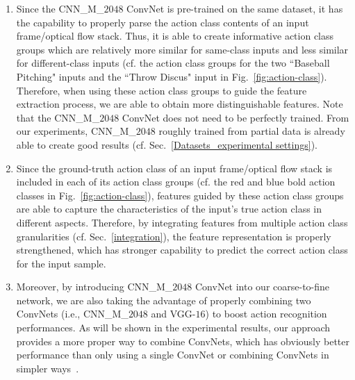 \documentclass[letterpaper]{article} %
\begin{document}
\begin{enumerate}
 \item Since the CNN\_M\_$2048$ ConvNet is pre-trained on the same dataset, it has the capability to properly parse the action class contents of an input frame/optical flow stack. Thus, it is able to create informative action class groups which are relatively more similar for same-class inputs and less similar for different-class inputs (cf. the action class groups for the two ``Baseball Pitching" inputs and the ``Throw Discus" input in Fig.~\ref{fig:action-class}). Therefore, when using these action class groups to guide the feature extraction process, we are able to obtain more distinguishable features. Note that the CNN\_M\_$2048$ ConvNet does not need to be perfectly trained. From our experiments, CNN\_M\_$2048$  roughly trained from partial data is already able to create good results (cf. Sec.~\ref{Datasets_experimental settings}).
 \item Since the ground-truth action class of an input frame/optical flow stack is included in each of its action class groups (cf. the red and blue bold action classes in Fig.~\ref{fig:action-class}), features guided by these action class groups are able to capture the characteristics of the input's true action class in different aspects. Therefore, by integrating features from multiple action class granularities (cf. Sec.~\ref{integration}), the feature representation is properly strengthened, which has stronger capability to predict the correct action class for the input sample. %

 \item Moreover, by introducing CNN\_M\_$2048$ ConvNet into our coarse-to-fine network, we are also taking the advantage of properly combining two ConvNets (i.e., CNN\_M\_$2048$ and VGG-$16$) to boost action recognition performances. As will be shown in the experimental results, our approach provides a more proper way to combine ConvNets, which has obviously better performance than only using a single ConvNet or combining ConvNets in simpler ways~\cite{twocnn,twocnn2}.


\end{enumerate}
\end{document}
